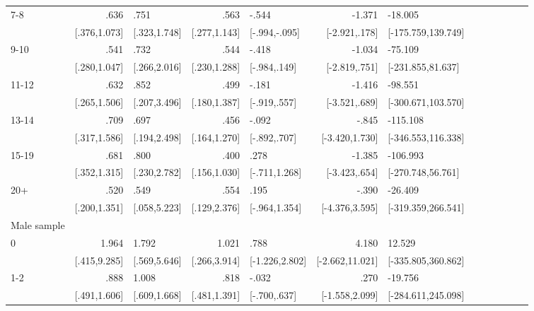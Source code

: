 \begin{table}[h]
\begin{adjustbox}{max width=\linewidth}
\begin{threeparttable}
{\begin{tabular}{l*{6}{D{.}{.}{-1}l}}
7-8             &            .636&            .751&            .563&           -.544&          -1.371&         -18.005\\
                &    [.376,1.073]&    [.323,1.748]&    [.277,1.143]&   [-.994,-.095]&   [-2.921,.178]&[-175.759,139.749]\\

9-10            &            .541&            .732&            .544&           -.418&          -1.034&         -75.109\\
                &    [.280,1.047]&    [.266,2.016]&    [.230,1.288]&    [-.984,.149]&   [-2.819,.751]&[-231.855,81.637]\\

11-12           &            .632&            .852&            .499&           -.181&          -1.416&         -98.551\\
                &    [.265,1.506]&    [.207,3.496]&    [.180,1.387]&    [-.919,.557]&   [-3.521,.689]&[-300.671,103.570]\\

13-14           &            .709&            .697&            .456&           -.092&           -.845&        -115.108\\
                &    [.317,1.586]&    [.194,2.498]&    [.164,1.270]&    [-.892,.707]&  [-3.420,1.730]&[-346.553,116.338]\\

15-19           &            .681&            .800&            .400&            .278&          -1.385&        -106.993\\
                &    [.352,1.315]&    [.230,2.782]&    [.156,1.030]&   [-.711,1.268]&   [-3.423,.654]&[-270.748,56.761]\\

20+             &            .520&            .549&            .554&            .195&           -.390&         -26.409\\
                &    [.200,1.351]&    [.058,5.223]&    [.129,2.376]&   [-.964,1.354]&  [-4.376,3.595]&[-319.359,266.541]\\
\midrule
Male sample &&&&&&\\
0               &           1.964&           1.792&           1.021&            .788&           4.180&          12.529\\
                &    [.415,9.285]&    [.569,5.646]&    [.266,3.914]&  [-1.226,2.802]& [-2.662,11.021]&[-335.805,360.862]\\

1-2             &            .888&           1.008&            .818&           -.032&            .270&         -19.756\\
                &    [.491,1.606]&    [.609,1.668]&    [.481,1.391]&    [-.700,.637]&  [-1.558,2.099]&[-284.611,245.098]\\


\end{tabular}}
\end{threeparttable}
\end{adjustbox}
\end{table}
